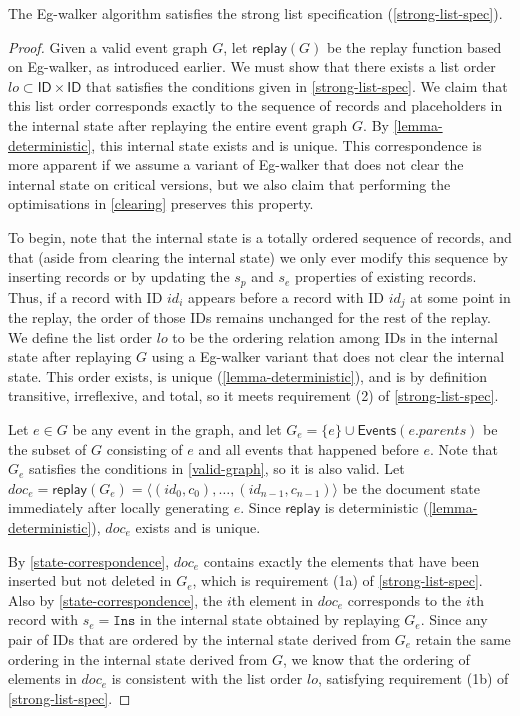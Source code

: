 \documentclass[sigplan,10pt]{acmart}
\newcommand{\algname}{Eg-walker\xspace}
\begin{document}
\begin{theorem}\label{main-theorem}
  The \algname algorithm satisfies the strong list specification (\autoref{strong-list-spec}).
\end{theorem}
\begin{proof}
  Given a valid event graph $G$, let $\mathsf{replay}(G)$ be the replay function based on \algname, as introduced earlier.
  We must show that there exists a list order $\mathit{lo} \subset \mathsf{ID} \times \mathsf{ID}$ that satisfies the conditions given in \autoref{strong-list-spec}.
  We claim that this list order corresponds exactly to the sequence of records and placeholders in the internal state after replaying the entire event graph $G$.
  By \autoref{lemma-deterministic}, this internal state exists and is unique.
  This correspondence is more apparent if we assume a variant of \algname that does not clear the internal state on critical versions, but we also claim that performing the optimisations in \autoref{clearing} preserves this property.

  To begin, note that the internal state is a totally ordered sequence of records, and that (aside from clearing the internal state) we only ever modify this sequence by inserting records or by updating the $s_p$ and $s_e$ properties of existing records.
  Thus, if a record with ID $\mathit{id}_i$ appears before a record with ID $\mathit{id}_j$ at some point in the replay, the order of those IDs remains unchanged for the rest of the replay.
  We define the list order $\mathit{lo}$ to be the ordering relation among IDs in the internal state after replaying $G$ using a \algname variant that does not clear the internal state.
  This order exists, is unique (\autoref{lemma-deterministic}), and is by definition transitive, irreflexive, and total, so it meets requirement (2) of \autoref{strong-list-spec}.

  Let $e \in G$ be any event in the graph, and let $G_e = \{e\} \cup \mathsf{Events}(e.\mathit{parents})$ be the subset of $G$ consisting of $e$ and all events that happened before $e$.
  Note that $G_e$ satisfies the conditions in \autoref{valid-graph}, so it is also valid.
  Let $\mathit{doc}_e = \mathsf{replay}(G_e) = \langle (\mathit{id}_0, c_0), \dots, (\mathit{id}_{n-1}, c_{n-1}) \rangle$ be the document state immediately after locally generating $e$.
  Since $\mathsf{replay}$ is deterministic (\autoref{lemma-deterministic}), $\mathit{doc}_e$ exists and is unique.

  By \autoref{state-correspondence}, $\mathit{doc}_e$ contains exactly the elements that have been inserted but not deleted in $G_e$, which is requirement (1a) of \autoref{strong-list-spec}.
  Also by \autoref{state-correspondence}, the $i$th element in $\mathit{doc}_e$ corresponds to the $i$th record with $s_e = \texttt{Ins}$ in the internal state obtained by replaying $G_e$.
  Since any pair of IDs that are ordered by the internal state derived from $G_e$ retain the same ordering in the internal state derived from $G$, we know that the ordering of elements in $\mathit{doc}_e$ is consistent with the list order $\mathit{lo}$, satisfying requirement (1b) of \autoref{strong-list-spec}.


\end{proof}
\end{document}
